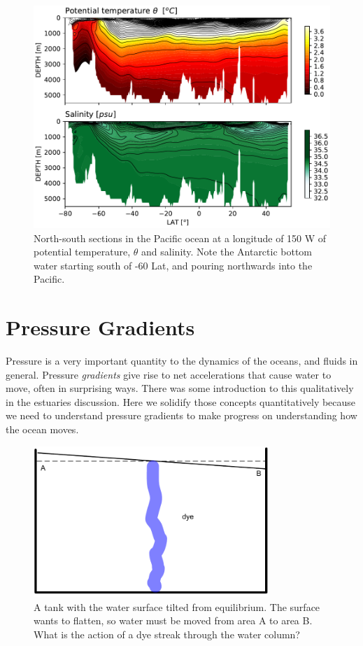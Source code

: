 \begin{figure}[hbt]
  \begin{center}
    \includegraphics[width=4.5in]{./figs/P16TempSalt.pdf}
    \caption{North-south sections in the Pacific ocean at a longitude of 150 W of potential temperature, $\theta$ and salinity. Note the Antarctic bottom water starting south of -60 Lat, and pouring northwards into the Pacific.}
    \label{fig:P16TempSalt}  
  \end{center}
\end{figure}


\chapter{Pressure Gradients}

Pressure is a very important quantity to the dynamics of the oceans,
and fluids in general.  Pressure \emph{gradients} give rise to net
accelerations that cause water to move, often in surprising ways.  There was some introduction to this qualitatively in the estuaries discussion.  Here we solidify those concepts quantitatively because we need to understand pressure gradients to make progress on understanding how the ocean moves.

\begin{figure}[htbp]
    \includegraphics[width=3.5in]{./figs/PGFig1.pdf}
    \caption{A tank with the water surface tilted from equilibrium.  The surface wants to flatten, so water must be moved from area A to area B.  What is the action of a dye streak through the water column?}
    \label{fig:PGFig1}
\end{figure}

